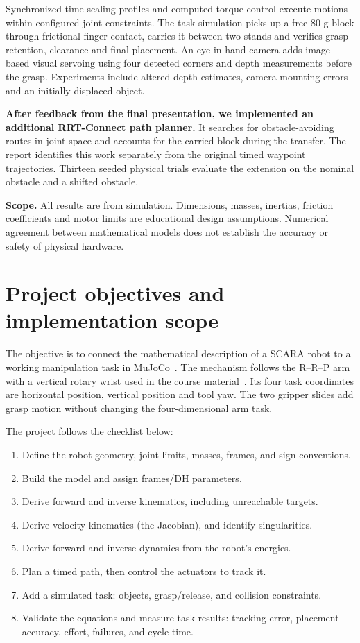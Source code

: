 \documentclass[11pt,a4paper]{article}
\begin{document}
Synchronized time-scaling profiles and computed-torque control execute
motions within configured joint constraints. The task simulation picks up a
free 80 g block through frictional finger contact, carries it between two
stands and verifies grasp retention, clearance and final placement. An
eye-in-hand camera adds image-based visual servoing using four detected
corners and depth measurements before the grasp. Experiments include altered
depth estimates, camera mounting errors and an initially displaced object.

\textbf{After feedback from the final presentation, we implemented an
additional RRT-Connect path planner.} It searches for obstacle-avoiding
routes in joint space and accounts for the carried block during the
transfer. The report identifies this work separately from the original
timed waypoint trajectories. Thirteen seeded physical trials evaluate the
extension on the nominal obstacle and a shifted obstacle.

\textbf{Scope.} All results are from simulation. Dimensions, masses,
inertias, friction coefficients and motor limits are educational design
assumptions. Numerical agreement between mathematical models does not
establish the accuracy or safety of physical hardware.

\clearpage
\tableofcontents
\clearpage
{}

\section{Project objectives and implementation scope}
The objective is to connect the mathematical description of a SCARA robot
to a working manipulation task in MuJoCo~\cite{mujocodocs}. The mechanism follows
the R--R--P arm with a vertical rotary wrist used in the course
material~\cite{course}.
Its four task coordinates are horizontal position, vertical position and
tool yaw. The two gripper slides add grasp motion without changing the
four-dimensional arm task.

The project follows the checklist below:
\begin{enumerate}
 \item Define the robot geometry, joint limits, masses, frames, and sign conventions.
 \item Build the model and assign frames/DH parameters.
 \item Derive forward and inverse kinematics, including unreachable targets.
 \item Derive velocity kinematics (the Jacobian), and identify singularities.
 \item Derive forward and inverse dynamics from the robot's energies.
 \item Plan a timed path, then control the actuators to track it.
 \item Add a simulated task: objects, grasp/release, and collision constraints.
 \item Validate the equations and measure task results: tracking error, placement accuracy, effort, failures, and cycle time.
\end{enumerate}
\end{document}
